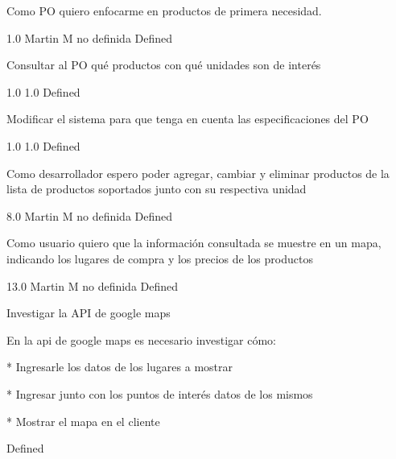 \vspace{20pt}

	{Como PO quiero enfocarme en productos de primera necesidad.} %
	{

} %
	{} %
	{1.0} %
	{Martin M} %
	{no definida} %
	{Defined} %

		{Consultar al PO qué productos con qué unidades son de interés} %
		{

} %
		{1.0} %
		{} %
		{1.0} %
		{Defined} %

		{Modificar el sistema para que tenga en cuenta las especificaciones del PO} %
		{

} %
		{1.0} %
		{} %
		{1.0} %
		{Defined} %


\vspace{20pt}

	{Como desarrollador espero poder agregar, cambiar y eliminar productos de la lista de productos soportados junto con su respectiva unidad} %
	{

} %
	{} %
	{8.0} %
	{Martin M} %
	{no definida} %
	{Defined} %


\vspace{20pt}

	{Como usuario quiero que la información consultada se muestre en un mapa, indicando los lugares de compra y los precios de los productos} %
	{

} %
	{} %
	{13.0} %
	{Martin M} %
	{no definida} %
	{Defined} %

		{Investigar la API de google maps} %
		{En la api de google maps es necesario investigar cómo:

  

* Ingresarle los datos de los lugares a mostrar

* Ingresar junto con los puntos de interés datos de los mismos

* Mostrar el mapa en el cliente

} %
		{} %
		{} %
		{} %
		{Defined} %

